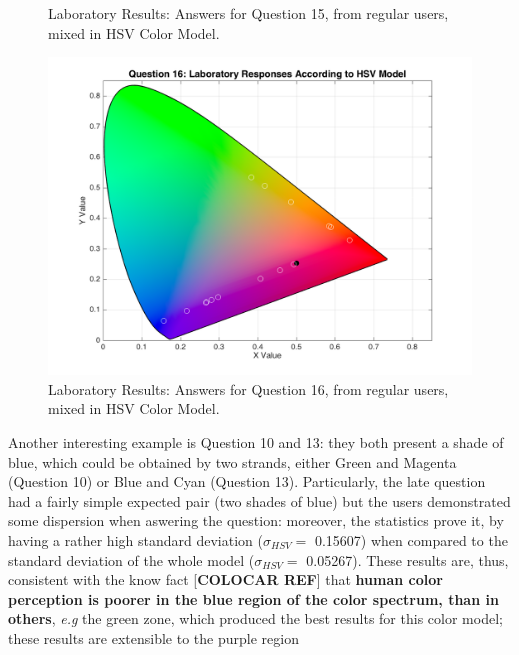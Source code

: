 \begin{enumerate}
\begin{figure}[htbp]
\begin{minipage}{0.48\textwidth}
      \caption[Laboratory Results: Answers for Question 15, from regular users, mixed in HSV Color Model.]{Laboratory Results: Answers for Question 15, from regular users, mixed in HSV Color Model.}
      \label{fig:labhsvregular_15}
    \end{minipage}\hfill
    \begin{minipage}{0.48\textwidth}
      \centering
      \includegraphics[width=\textwidth]{images/16_lab_HSVresponses.png}
      \caption[Laboratory Results: Answers for Question 16, from regular users, mixed in HSV Color Model.]{Laboratory Results: Answers for Question 16, from regular users, mixed in HSV Color Model.}
      \label{fig:labhsvregular_16}
    \end{minipage}
  \end{figure}
\end{enumerate}
%
Another interesting example is Question 10 and 13: they both present a shade of blue, which could be obtained by two strands, either Green and Magenta (Question 10) or Blue and Cyan (Question 13). Particularly, the late question had a fairly simple expected pair (two shades of blue)
but the users demonstrated some dispersion when aswering the question: moreover, the statistics prove it, by having a rather high standard deviation ($\sigma_{HSV} = $ 0.15607) when compared to the standard deviation of the whole model ($\sigma_{HSV} = $ 0.05267). These results are, thus,
consistent with the know fact [\textbf{COLOCAR REF}] that \textbf{human color perception is poorer in the blue region of the color spectrum, than in others}, \emph{e.g} the green zone, which produced the best results for this color model; these results are extensible to the purple region
